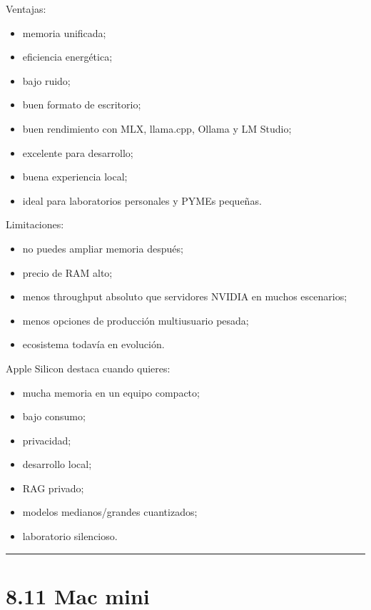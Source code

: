 Ventajas:

\begin{itemize}
\tightlist
\item
  memoria unificada;
\item
  eficiencia energética;
\item
  bajo ruido;
\item
  buen formato de escritorio;
\item
  buen rendimiento con MLX, llama.cpp, Ollama y LM Studio;
\item
  excelente para desarrollo;
\item
  buena experiencia local;
\item
  ideal para laboratorios personales y PYMEs pequeñas.
\end{itemize}

Limitaciones:

\begin{itemize}
\tightlist
\item
  no puedes ampliar memoria después;
\item
  precio de RAM alto;
\item
  menos throughput absoluto que servidores NVIDIA en muchos escenarios;
\item
  menos opciones de producción multiusuario pesada;
\item
  ecosistema todavía en evolución.
\end{itemize}

Apple Silicon destaca cuando quieres:

\begin{itemize}
\tightlist
\item
  mucha memoria en un equipo compacto;
\item
  bajo consumo;
\item
  privacidad;
\item
  desarrollo local;
\item
  RAG privado;
\item
  modelos medianos/grandes cuantizados;
\item
  laboratorio silencioso.
\end{itemize}

\begin{center}\rule{0.5\linewidth}{0.5pt}\end{center}

\section{8.11 Mac mini}\label{mac-mini}

